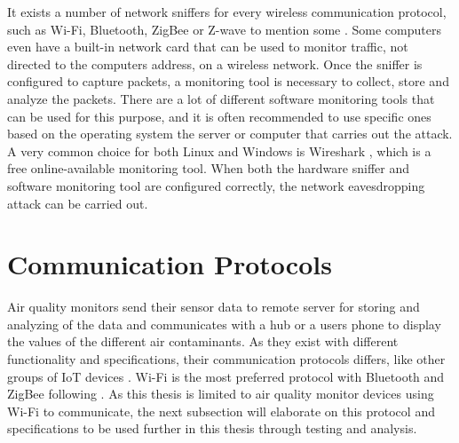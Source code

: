 It exists a number of network sniffers for every wireless communication protocol, such as \gls{Wi-Fi}, Bluetooth, ZigBee or Z-wave to mention some \cite{Sniffingtech}. Some computers even have a built-in network card that can be used to monitor traffic, not directed to the computers address, on a wireless network. Once the sniffer is configured to capture packets, a monitoring tool is necessary to collect, store and analyze the packets. There are a lot of different software monitoring tools that can be used for this purpose, and it is often recommended to use specific ones based on the operating system the server or computer that carries out the attack. A very common choice for both Linux and Windows is Wireshark \cite{Wireshark}, which is a free online-available monitoring tool. When both the hardware sniffer and software monitoring tool are configured correctly, the network eavesdropping attack can be carried out. 

\section{Communication Protocols}
Air quality monitors send their sensor data to remote server for storing and analyzing of the data and communicates with a hub or a users phone to display the values of the different air contaminants. As they exist with different functionality and specifications, their communication protocols differs, like other groups of \gls{IoT} devices \cite{AQMBigSource}. \gls{Wi-Fi} is the most preferred protocol with Bluetooth and ZigBee following \cite{saini2020indoor}. As this thesis is limited to air quality monitor devices using \gls{Wi-Fi} to communicate, the next subsection will elaborate on this protocol and specifications to be used further in this thesis through testing and analysis. 

